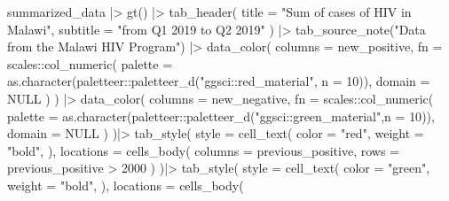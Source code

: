 \documentclass[
]{article}
\newenvironment{Shaded}{\begin{snugshade}}{\end{snugshade}}
\newcommand{\AttributeTok}[1]{\textcolor[rgb]{0.77,0.63,0.00}{#1}}
\newcommand{\ConstantTok}[1]{\textcolor[rgb]{0.00,0.00,0.00}{#1}}
\newcommand{\DecValTok}[1]{\textcolor[rgb]{0.00,0.00,0.81}{#1}}
\newcommand{\FunctionTok}[1]{\textcolor[rgb]{0.00,0.00,0.00}{#1}}
\newcommand{\NormalTok}[1]{#1}
\newcommand{\SpecialCharTok}[1]{\textcolor[rgb]{0.00,0.00,0.00}{#1}}
\newcommand{\StringTok}[1]{\textcolor[rgb]{0.31,0.60,0.02}{#1}}
\begin{document}
\begin{Shaded}
\begin{Highlighting}[]
\NormalTok{summarized\_data }\SpecialCharTok{|\textgreater{}} 
  \FunctionTok{gt}\NormalTok{() }\SpecialCharTok{|\textgreater{}} 
  \FunctionTok{tab\_header}\NormalTok{(}
    \AttributeTok{title =} \StringTok{"Sum of cases of HIV in Malawi"}\NormalTok{,}
    \AttributeTok{subtitle =} \StringTok{"from Q1 2019 to Q2 2019"}
\NormalTok{  ) }\SpecialCharTok{|\textgreater{}} 
  \FunctionTok{tab\_source\_note}\NormalTok{(}\StringTok{"Data from the Malawi HIV Program"}\NormalTok{) }\SpecialCharTok{|\textgreater{}} 
  \FunctionTok{data\_color}\NormalTok{(}
    \AttributeTok{columns =}\NormalTok{ new\_positive,}
    \AttributeTok{fn =}\NormalTok{ scales}\SpecialCharTok{::}\FunctionTok{col\_numeric}\NormalTok{(}
      \AttributeTok{palette =} \FunctionTok{as.character}\NormalTok{(paletteer}\SpecialCharTok{::}\FunctionTok{paletteer\_d}\NormalTok{(}\StringTok{"ggsci::red\_material"}\NormalTok{, }\AttributeTok{n =} \DecValTok{10}\NormalTok{)),}
      \AttributeTok{domain =} \ConstantTok{NULL}
\NormalTok{    )}
\NormalTok{  ) }\SpecialCharTok{|\textgreater{}} 
  \FunctionTok{data\_color}\NormalTok{(}
    \AttributeTok{columns =}\NormalTok{ new\_negative,}
    \AttributeTok{fn =}\NormalTok{ scales}\SpecialCharTok{::}\FunctionTok{col\_numeric}\NormalTok{(}
      \AttributeTok{palette =} \FunctionTok{as.character}\NormalTok{(paletteer}\SpecialCharTok{::}\FunctionTok{paletteer\_d}\NormalTok{(}\StringTok{"ggsci::green\_material"}\NormalTok{,}\AttributeTok{n =} \DecValTok{10}\NormalTok{)),}
      \AttributeTok{domain =} \ConstantTok{NULL}
\NormalTok{    )}
\NormalTok{  )}\SpecialCharTok{|\textgreater{}} 
  \FunctionTok{tab\_style}\NormalTok{(}
    \AttributeTok{style =} \FunctionTok{cell\_text}\NormalTok{(}
      \AttributeTok{color =} \StringTok{"red"}\NormalTok{,}
      \AttributeTok{weight =} \StringTok{"bold"}\NormalTok{,}
\NormalTok{    ),}
    \AttributeTok{locations =} \FunctionTok{cells\_body}\NormalTok{(}
      \AttributeTok{columns =}\NormalTok{ previous\_positive,}
      \AttributeTok{rows =}\NormalTok{ previous\_positive }\SpecialCharTok{\textgreater{}} \DecValTok{2000}
\NormalTok{    )}
\NormalTok{  )}\SpecialCharTok{|\textgreater{}} 
  \FunctionTok{tab\_style}\NormalTok{(}
    \AttributeTok{style =} \FunctionTok{cell\_text}\NormalTok{(}
      \AttributeTok{color =} \StringTok{"green"}\NormalTok{,}
      \AttributeTok{weight =} \StringTok{"bold"}\NormalTok{,}
\NormalTok{    ),}
    \AttributeTok{locations =} \FunctionTok{cells\_body}\NormalTok{(}

\end{Highlighting}
\end{Shaded}
\end{document}
